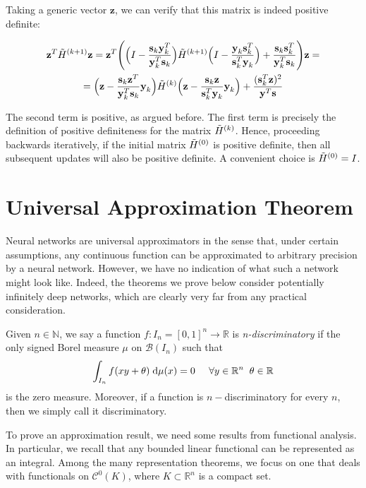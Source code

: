 \documentclass{article}
\numberwithin{equation}{subsection}
\begin{document}
Taking a generic vector $\textbf{z}$, we can verify that this matrix is indeed positive definite:

\begin{gather*}
    \textbf{z}^T \Tilde{H}^{(k+1)} \textbf{z} = \textbf{z}^T \Bigg( \Big( I - \frac{\textbf{s}_k\textbf{y}_k^T}{\textbf{y}_k^T\textbf{s}_k} \Big) \Tilde{H}^{(k+1)} \Big( I - \frac{\textbf{y}_k \textbf{s}_k^T}{\textbf{s}_k^T \textbf{y}_k} \Big) + \frac{\textbf{s}_k \textbf{s}_k^T}{\textbf{y}_k^T \textbf{s}_k} \Bigg) \textbf{z} = \\
    = \Big( \textbf{z} - \frac{\textbf{s}_k\textbf{z}^T}{\textbf{y}_k^T\textbf{s}_k} \textbf{y}_k \Big) \Tilde{H}^{(k)} \Big( \textbf{z} - \frac{\textbf{s}_k \textbf{z}}{\textbf{s}_k^T \textbf{y}_k} \textbf{y}_k \Big) + \frac{(\textbf{s}_k^T \textbf{z})^2}{\textbf{y}^T \textbf{s}}
\end{gather*}

The second term is positive, as argued before. The first term is precisely the definition of positive definiteness for the matrix $\Tilde{H}^{(k)}$. Hence, proceeding backwards iteratively, if the initial matrix $\Tilde{H}^{(0)}$ is positive definite, then all subsequent updates will also be positive definite.
A convenient choice is $\Tilde{H}^{(0)} = I$.

\section{Universal Approximation Theorem}
Neural networks are universal approximators in the sense that, under certain assumptions, any continuous function can be approximated to arbitrary precision by a neural network. However, we have no indication of what such a network might look like. Indeed, the theorems we prove below consider potentially infinitely deep networks, which are clearly very far from any practical consideration.

Given $n \in \mathbb{N}$, we say a function $f : I_n = [0,1]^n \to \mathbb{R}$ is \textit{n-discriminatory} if the only signed Borel measure $\mu$ on $\mathcal{B}(I_n)$ such that
\begin{equation*}
    \int_{I_n} f(xy+\theta) \;\text{d} \mu(x) = 0 \;\;\;\;\; \forall y \in \mathbb{R}^n \;\; \theta \in \mathbb{R}
\end{equation*}
is the zero measure. Moreover, if a function is $n-$discriminatory for every $n$, then we simply call it discriminatory.

To prove an approximation result, we need some results from functional analysis. In particular, we recall that any bounded linear functional can be represented as an integral. Among the many representation theorems, we focus on one that deals with functionals on $\mathcal{C}^0(K)$, where $K \subset \mathbb{R}^n$ is a compact set.
\end{document}
